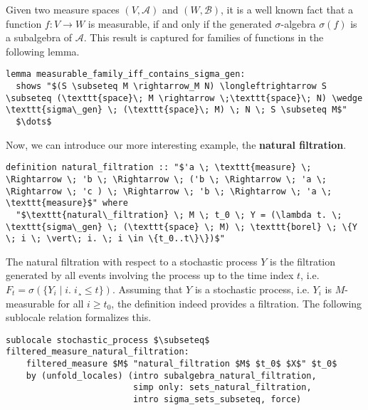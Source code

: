 Given two measure spaces $(V, \mathcal{A})$ and $(W, \mathcal{B})$, it is a well known fact that a function $f : V \rightarrow W$ is measurable, if and only if the generated $\sigma$-algebra $\sigma(f)$ is a subalgebra of $\mathcal{A}$. This result is captured for families of functions in the following lemma.

\begin{isalemma}
{\small
\begin{lstlisting}[style=isabelle]
lemma measurable_family_iff_contains_sigma_gen:
  shows "$(S \subseteq M \rightarrow_M N) \longleftrightarrow S \subseteq (\texttt{space}\; M \rightarrow \;\texttt{space}\; N) \wedge \texttt{sigma\_gen} \; (\texttt{space}\; M) \; N \; S \subseteq M$"
  $\dots$
\end{lstlisting}
}
\end{isalemma}

Now, we can introduce our more interesting example, the \textbf{natural filtration}.

\begin{isadefinition}
{\small
\begin{lstlisting}[style=isabelle]
definition natural_filtration :: "$'a \; \texttt{measure} \; \Rightarrow \; 'b \; \Rightarrow \; ('b \; \Rightarrow \; 'a \; \Rightarrow \; 'c ) \; \Rightarrow \; 'b \; \Rightarrow \; 'a \; \texttt{measure}$" where
  "$\texttt{natural\_filtration} \; M \; t_0 \; Y = (\lambda t. \; \texttt{sigma\_gen} \; (\texttt{space} \; M) \; \texttt{borel} \; \{Y \; i \; \vert\; i. \; i \in \{t_0..t\}\})$"
\end{lstlisting}
}
\end{isadefinition}
The natural filtration with respect to a stochastic process $Y$ is the filtration generated by all events involving the process up to the time index $t$, i.e. $F_t = \sigma(\{Y_i \; \vert\; i. \; i¸ \le t\})$. Assuming that $Y$ is a stochastic process, i.e. $Y_i$ is $M$-measurable for all $i \ge t_0$, the definition indeed provides a filtration. The following sublocale relation formalizes this.

\begin{isalemma}
{\small
\begin{lstlisting}[style=isabelle]
sublocale stochastic_process $\subseteq$ filtered_measure_natural_filtration: 
	filtered_measure $M$ "natural_filtration $M$ $t_0$ $X$" $t_0$
    by (unfold_locales) (intro subalgebra_natural_filtration, 
						 simp only: sets_natural_filtration, 
						 intro sigma_sets_subseteq, force) 
\end{lstlisting}
}
\end{isalemma}

